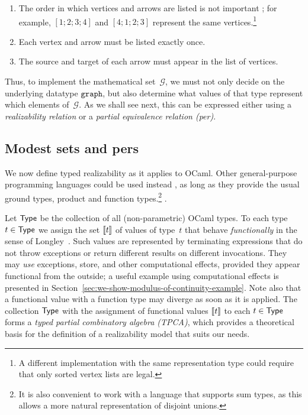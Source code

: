 %
\begin{enumerate}
\item The order in which vertices and arrows are listed is not
  important%
\iflong
; for example, $[1;2;3;4]$ and $[4;1;2;3]$ represent the same vertices.\footnote{
  A different implementation with the same representation type could require
  that only sorted vertex lists are legal.}
\fi %
\item Each vertex and arrow must be listed exactly once.
\item The source and target of each arrow must appear in the list of vertices.
\end{enumerate}
%
Thus, to implement the mathematical set~$\mathcal{G}$, we must not
only decide on the underlying datatype $\mathtt{graph}$, but also
determine what values of that type represent which elements
of~$\mathcal{G}$.  As we shall see next, this can be expressed
either using a \emph{realizability relation} or a \emph{partial
  equivalence relation (per)}.

\subsection{Modest sets and pers}
\label{sec:modest-sets-pers}

We now define typed realizability as it
applies to OCaml. Other general-purpose programming languages could be
used instead%
\iflong
, as long as they provide the usual ground types, product
and function types.\footnote{It is also convenient to work with a
language that supports sum types, as this allows a more natural
representation of disjoint unions.}
\else
.
\fi %

\goodbreak

Let $\mathsf{Type}$ be the collection of all (non-parametric) OCaml types. To
each type $t \in \mathsf{Type}$ we assign the set $[\![t]\!]$ of values of
type~$t$ that behave \emph{functionally} in the sense
of Longley~\cite{longley99when}. Such values are represented by terminating
expressions that do not throw exceptions or return different results
on different invocations.  They may \emph{use} exceptions,
store, and other computational effects, provided they appear
functional from the outside; a useful example using computational effects is
presented in Section~\ref{sec:we-show-modulus-of-continuity-example}.
Note also that a functional value with a function type may diverge as
soon as it is applied.   The collection $\mathsf{Type}$ with the assignment of functional
values $[\![t]\!]$ to each $t \in \mathsf{Type}$ forms a \emph{typed partial
  combinatory algebra (TPCA)}, which provides a theoretical basis for
the definition of a realizability model that suits our needs.

